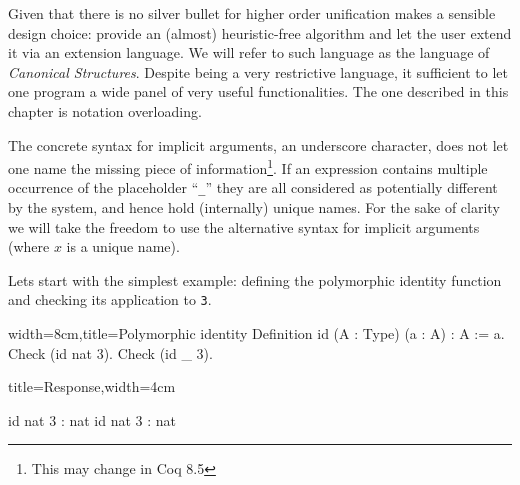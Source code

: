 Given that there is no silver bullet for higher order unification
\Coq{} makes a sensible design choice: provide an (almost)
heuristic-free algorithm and let the user extend it via an extension
language.  We will refer to such language as the language of
\emph{Canonical Structures}.  Despite being a very restrictive language,
it sufficient to let one program a wide panel of very useful
functionalities.  The one described in this chapter is notation
overloading.

The concrete syntax for implicit arguments, an underscore character,
does not let one name the missing piece of information\footnote{This
may change in Coq 8.5}.  If an expression contains multiple occurrence
of the placeholder ``\lstinline/_/'' they are all considered as
potentially different by the system, and hence hold (internally)
unique names.  For the sake of clarity we will take the freedom to
use the alternative syntax  for implicit arguments (where
$x$ is a unique name).


Lets start with the simplest example: defining the polymorphic identity
function and checking its application to \lstinline/3/.

\begin{coq}{width=8cm,title=Polymorphic identity}
Definition id (A : Type) (a : A) : A := a.
Check (id nat 3).
Check (id _ 3).
\end{coq}
\begin{coqout}{title=Response,width=4cm}

id nat 3 : nat 
id nat 3 : nat
\end{coqout}

